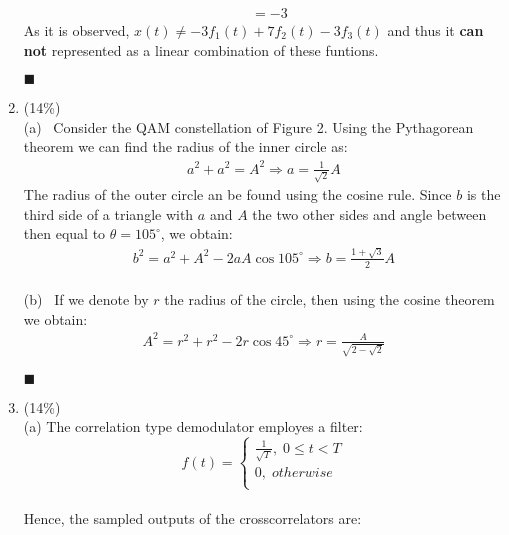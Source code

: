 \documentclass[a4paper,12pt]{article}
\begin{document}
\begin{enumerate}
\begin{align*}
                &= -3
        \end{align*}
        As it is observed, $x(t) \neq -3f_1(t) + 7f_2(t) - 3f_3(t)$ and thus it \textbf{can not} represented as a linear combination of these funtions.
            \begin{flushright}
                $\blacksquare$
            \end{flushright}
        \item (14\%) \\
        (a) \ Consider the QAM constellation of Figure 2. Using the Pythagorean theorem we can find the radius of the inner circle as:
        \begin{align*}
            a^2+a^2=A^2\Longrightarrow a=\frac{1}{\sqrt{2}}A
        \end{align*}
        The radius of the outer circle an be found using the cosine rule. Since $b$ is the third side of a triangle with $a$ and $A$ the two other sides and angle between then equal to $\theta=105^\circ$, we obtain:
        \begin{align*}
            b^2=a^2+A^2-2aA\cos105^\circ\Longrightarrow b=\frac{1+\sqrt{3}}{2}A
        \end{align*}\\
        (b) \ If we denote by $r$ the radius of the circle, then using the cosine theorem we obtain:
        \begin{align*}
            A^2=r^2+r^2-2r\cos 45^\circ\Longrightarrow r=\frac{A}{\sqrt{2-\sqrt{2}}}
        \end{align*}
            \begin{flushright}
                $\blacksquare$
            \end{flushright}
        \item (14\%) \\ 
            (a) The correlation type demodulator employes a filter: \\ 
            $$f(t) = \left\{ 
            \begin{aligned}
                \frac{1}{\sqrt{T}}, \; 0 \leq t < T \\
                 0, \; otherwise \\ 
            \end{aligned}
            \right.
            $$ \\ 
            Hence, the sampled outputs of the crosscorrelators are: \\

\end{enumerate}
\end{document}
